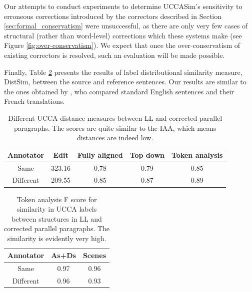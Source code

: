 \documentclass[letter,11pt]{article}
\begin{document}
Our attempts to conduct experiments to determine {\sc UCCASim}'s sensitivity to erroneous
corrections introduced by the correctors described in Section \ref{sec:formal_conservatism} were
unsuccessful, as there are only very few cases of structural (rather than word-level)
corrections which these systems make (see Figure \ref{fig:over-conservatism}).
We expect that once the over-conservatism of existing correctors is resolved,
such an evaluation will be made possible.


Finally, Table \ref{tab:Token_analysis} presents the results of label distributional
similarity measure, {\sc DistSim}, between the source and reference sentences.
Our results are similar to the ones obtained by ,
who compared standard English sentences and their French translations.


\begin{table}[h!]
  \centering
  \singlespacing
  \begin{tabular}{c|c|c|c|c}
    Annotator & Edit & Fully aligned & Top down & Token analysis
    \\
    \hline
    Same & 323.16 & 0.78 & 0.79 & 0.85
    \\
    Different & 209.55 & 0.85 & 0.87 & 0.89
    \\
  \end{tabular}
  \caption{Different UCCA distance measures between LL and corrected parallel paragraphs. The scores are quite similar to the IAA, which means distances are indeed low.\label{tab:Distances}}
\end{table}


\begin{table}[h!]
  \centering
  \begin{tabular}{c|c|c}
    Annotator& As+Ds & Scenes\\
    \hline
    Same  & 0.97 & 0.96\\
    Different & 0.96
    & 0.93
    \\
  \end{tabular}
  \caption{Token analysis F score for similarity in UCCA labels between structures in LL and corrected parallel paragraphs. The similarity is evidently very high.\label{tab:Token_analysis}}
\end{table}
\end{document}
